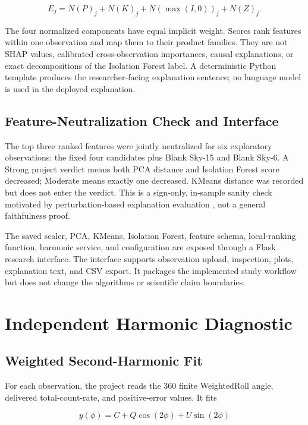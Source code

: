 \documentclass[conference]{IEEEtran}
\begin{document}
\begin{equation*}
E_j=N(P)_j+N(K)_j+N(\max(I,0))_j+N(Z)_j.
\end{equation*}

The four normalized components have equal implicit weight. Scores rank features within one observation and map them to their product families. They are not SHAP values, calibrated cross-observation importances, causal explanations, or exact decompositions of the Isolation Forest label. A deterministic Python template produces the researcher-facing explanation sentence; no language model is used in the deployed explanation.


\subsection{Feature-Neutralization Check and Interface}

The top three ranked features were jointly neutralized for six exploratory observations: the fixed four candidates plus Blank Sky-15 and Blank Sky-6. A Strong project verdict means both PCA distance and Isolation Forest score decreased; Moderate means exactly one decreased. KMeans distance was recorded but does not enter the verdict. This is a sign-only, in-sample sanity check motivated by perturbation-based explanation evaluation \cite{yeh2019infidelity}, not a general faithfulness proof.


The saved scaler, PCA, KMeans, Isolation Forest, feature schema, local-ranking function, harmonic service, and configuration are exposed through a Flask research interface. The interface supports observation upload, inspection, plots, explanation text, and CSV export. It packages the implemented study workflow but does not change the algorithms or scientific claim boundaries.


\section{Independent Harmonic Diagnostic}

\subsection{Weighted Second-Harmonic Fit}

For each observation, the project reads the 360 finite WeightedRoll angle, delivered total-count-rate, and positive-error values. It fits


\begin{equation*}
y(\phi)=C+Q\cos(2\phi)+U\sin(2\phi)
\end{equation*}
\end{document}
